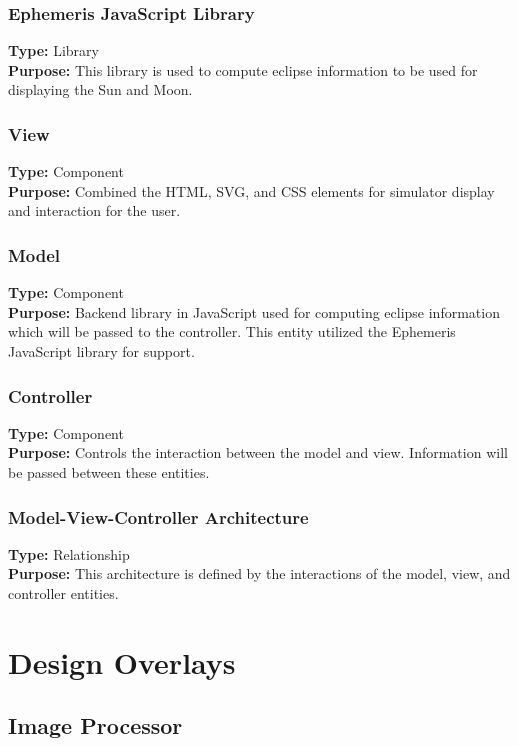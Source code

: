\documentclass[10pt, onecolumn, draftclsnofoot, letterpaper, compsoc]{IEEEtran}
\begin{document}
  \subsubsection{Ephemeris JavaScript Library}
  \textbf{Type:} Library \\
  \textbf{Purpose:} This library is used to compute eclipse
  information to be used for displaying the Sun and Moon.

  \subsubsection{View}
  \textbf{Type:} Component \\
  \textbf{Purpose:} Combined the HTML, SVG, and CSS elements
  for simulator display and interaction for the user.

  \subsubsection{Model}
  \textbf{Type:} Component \\
  \textbf{Purpose:} Backend library in JavaScript used for
  computing eclipse information which will be passed to the
  controller. This entity utilized the Ephemeris JavaScript
  library for support.

  \subsubsection{Controller}
  \textbf{Type:} Component \\
  \textbf{Purpose:}  Controls the interaction between the
  model and view. Information will be passed between these
  entities.

  \subsubsection{Model-View-Controller Architecture}
  \textbf{Type:} Relationship \\
  \textbf{Purpose:} This architecture is defined by the interactions of the model, view, and controller entities.

\section{Design Overlays}

\subsection{Image Processor}
\end{document}
